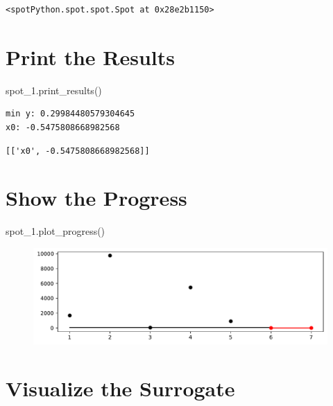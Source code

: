 \documentclass[
  letterpaper,
  DIV=11,
  numbers=noendperiod]{scrreprt}
\newenvironment{Shaded}{\begin{snugshade}}{\end{snugshade}}
\newcommand{\NormalTok}[1]{\textcolor[rgb]{0.00,0.23,0.31}{#1}}
\begin{document}
\begin{verbatim}
<spotPython.spot.spot.Spot at 0x28e2b1150>
\end{verbatim}

\hypertarget{print-the-results-5}{%
\section{Print the Results}\label{print-the-results-5}}

\begin{Shaded}
\begin{Highlighting}[]
\NormalTok{spot\_1.print\_results()}
\end{Highlighting}
\end{Shaded}

\begin{verbatim}
min y: 0.29984480579304645
x0: -0.5475808668982568
\end{verbatim}

\begin{verbatim}
[['x0', -0.5475808668982568]]
\end{verbatim}

\hypertarget{show-the-progress-2}{%
\section{Show the Progress}\label{show-the-progress-2}}

\begin{Shaded}
\begin{Highlighting}[]
\NormalTok{spot\_1.plot\_progress()}
\end{Highlighting}
\end{Shaded}

\begin{figure}[H]

{\centering \includegraphics{a_04_spot_doc_files/figure-pdf/cell-8-output-1.pdf}

}

\end{figure}

\hypertarget{visualize-the-surrogate}{%
\section{Visualize the Surrogate}\label{visualize-the-surrogate}}
\end{document}
